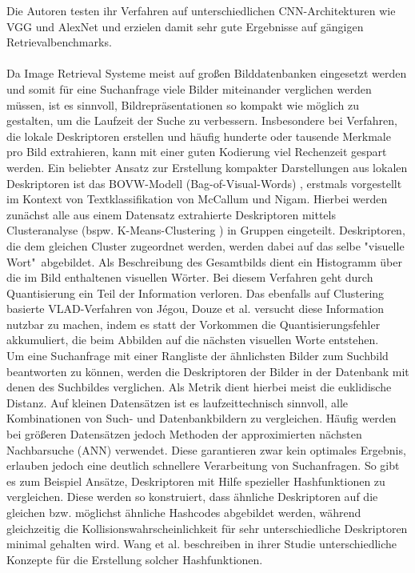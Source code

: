 Die Autoren testen ihr Verfahren auf unterschiedlichen CNN-Architekturen wie VGG \cite{vgg} und AlexNet \cite{alexnet} und erzielen damit sehr gute Ergebnisse auf gängigen Retrievalbenchmarks.
\\\\
Da Image Retrieval Systeme meist auf großen Bilddatenbanken eingesetzt werden und somit für eine Suchanfrage viele Bilder miteinander verglichen werden müssen, ist es sinnvoll, Bildrepräsentationen so kompakt wie möglich zu gestalten, um die Laufzeit der Suche zu verbessern. Insbesondere bei Verfahren, die lokale Deskriptoren erstellen und häufig hunderte oder tausende Merkmale pro Bild extrahieren, kann mit einer guten Kodierung viel Rechenzeit gespart werden. Ein beliebter Ansatz zur Erstellung kompakter Darstellungen aus lokalen Deskriptoren ist das BOVW-Modell (Bag-of-Visual-Words) \cite{bow}, erstmals vorgestellt im Kontext von Textklassifikation von McCallum und Nigam. Hierbei werden zunächst alle aus einem Datensatz extrahierte Deskriptoren mittels Clusteranalyse (bspw. K-Means-Clustering \cite{k_means}) in Gruppen eingeteilt. Deskriptoren, die dem gleichen Cluster zugeordnet werden, werden dabei auf das selbe "visuelle Wort"\ abgebildet. Als Beschreibung des Gesamtbilds dient ein Histogramm über die im Bild enthaltenen visuellen Wörter. Bei diesem Verfahren geht durch Quantisierung ein Teil der Information verloren. Das ebenfalls auf Clustering basierte VLAD-Verfahren \cite{vlad} von Jégou, Douze et al. versucht diese Information nutzbar zu machen, indem es statt der Vorkommen die Quantisierungsfehler akkumuliert, die beim Abbilden auf die nächsten visuellen Worte entstehen. \\
Um eine Suchanfrage mit einer Rangliste der ähnlichsten Bilder zum Suchbild beantworten zu können, werden die Deskriptoren der Bilder in der Datenbank mit denen des Suchbildes verglichen. Als Metrik dient hierbei meist die euklidische Distanz. Auf kleinen Datensätzen ist es laufzeittechnisch sinnvoll, alle Kombinationen von Such- und Datenbankbildern zu vergleichen. Häufig werden bei größeren Datensätzen jedoch Methoden der approximierten nächsten Nachbarsuche (ANN) verwendet. Diese garantieren zwar kein optimales Ergebnis, erlauben jedoch eine deutlich schnellere Verarbeitung von Suchanfragen. So gibt es zum Beispiel Ansätze, Deskriptoren mit Hilfe spezieller Hashfunktionen zu vergleichen. Diese werden so konstruiert, dass ähnliche Deskriptoren auf die gleichen bzw. möglichst ähnliche Hashcodes abgebildet werden, während gleichzeitig die Kollisionswahrscheinlichkeit für sehr unterschiedliche Deskriptoren minimal gehalten wird. Wang et al. beschreiben in ihrer Studie \cite{simsearch} unterschiedliche Konzepte für die Erstellung solcher Hashfunktionen.



